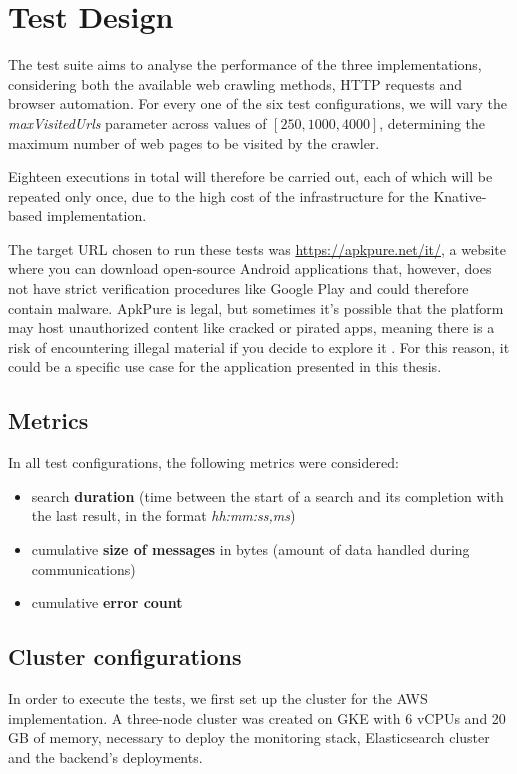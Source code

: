 \documentclass[../thesis.tex]{subfiles}
\begin{document}
\section{Test Design}
The test suite aims to analyse the performance of the three implementations, considering both the available web crawling methods, \acrshort{HTTP} requests and browser automation. For every one of the six test configurations, we will vary the \textit{maxVisitedUrls} parameter across values of $[250, 1000, 4000]$, determining the maximum number of web pages to be visited by the crawler. 

Eighteen executions in total will therefore be carried out, each of which will be repeated only once, due to the high cost of the infrastructure for the Knative-based implementation.

The target \acrshort{URL} chosen to run these tests was \href{https://apkpure.net/it/}{https://apkpure.net/it/}, a website where you can download open-source Android applications that, however, does not have strict verification procedures like Google Play and could therefore contain malware. ApkPure is legal, but sometimes it's possible that the platform may host unauthorized content like cracked or pirated apps, meaning there is a risk of encountering illegal material if you decide to explore it \cite{site:nordvpn_apkpure, site:avast_apkpure}. For this reason, it could be a specific use case for the application presented in this thesis.

\subsection{Metrics}
In all test configurations, the following metrics were considered:

\begin{itemize}
    \item search \textbf{duration} (time between the start of a search and its completion with the last result, in the format \textit{hh:mm:ss,ms})
    \item cumulative \textbf{size of messages} in bytes (amount of data handled during communications)
    \item cumulative \textbf{error count}
\end{itemize}

\subsection{Cluster configurations}
In order to execute the tests, we first set up the cluster for the \acrshort{AWS} implementation. A three-node cluster was created on \acrshort{GKE} with 6 vCPUs and 20 GB of memory, necessary to deploy the monitoring stack, Elasticsearch cluster and the backend's \gls{deployment}s.
\end{document}
